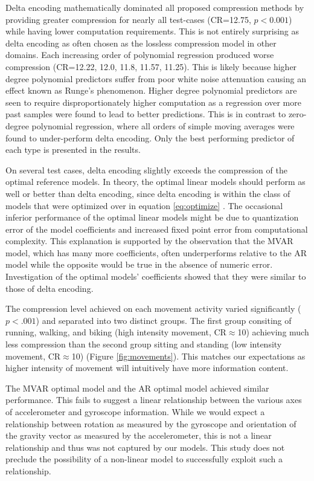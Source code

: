 \documentclass[journal]{IEEEtran}
\begin{document}
Delta encoding mathematically dominated all proposed compression methods by providing greater compression for nearly all test-cases (CR=12.75, $p<0.001$) while having lower computation requirements. This is not entirely surprising as delta encoding as often chosen as the lossless compression model in other domains\cite{Blalock2018}\cite{Coalson2008}. Each increasing order of polynomial regression produced worse compression (CR=12.22, 12.0, 11.8, 11.57, 11.25). This is likely because higher degree polynomial predictors suffer from poor white noise attenuation \cite{Tanskanen2000} causing an effect known as Runge's phenomenon. Higher degree polynomial predictors are seen to require disproportionately higher computation as a regression over more past samples were found to lead to better predictions. This is in contrast to zero-degree polynomial regression, where all orders of simple moving averages were found to under-perform delta encoding. Only the best performing predictor of each type is presented in the results.

On several test cases, delta encoding slightly exceeds the compression of the optimal reference models. In theory, the optimal linear models should perform as well or better than delta encoding, since delta encoding is within the class of models that were optimized over in equation \eqref{eq:optimize} . The occasional inferior performance of the optimal linear models might be due to quantization error of the model coefficients and increased fixed point error from computational complexity. This explanation is supported by the observation that the MVAR model, which has many more coefficients, often underperforms relative to the AR model while the opposite would be true in the absence of numeric error. Investigation of the optimal models' coefficients showed that they were similar to those of delta encoding.

The compression level achieved on each movement activity varied significantly ($p<.001$) and separated into two distinct groups. The first group consiting of running, walking, and biking (high intensity movement, CR$\approx$10) achieving much less compression than the second group sitting and standing (low intensity movement, CR$\approx$10) (Figure \ref{fig:movements}). This matches our expectations as higher intensity of movement will intuitively have more information content.

The MVAR optimal model and the AR optimal model achieved similar performance. This fails to suggest a linear relationship between the various axes of accelerometer and gyroscope information. While we would expect a relationship between rotation as measured by the gyroscope and orientation of the gravity vector as measured by the accelerometer, this is not a linear relationship and thus was not captured by our models. This study does not preclude the possibility of a non-linear model to successfully exploit such a relationship.
\end{document}
